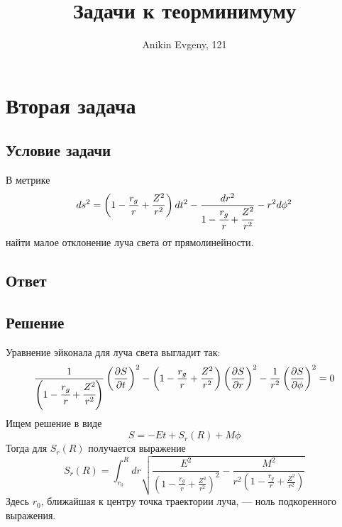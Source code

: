 \documentclass{article}
\title{Задачи к теорминимуму}
\author{Anikin Evgeny, 121}
\begin{document}
\maketitle
\section{Вторая задача}
\subsection{Условие задачи}
В метрике
\begin{equation}
ds^2 = \left(1 - \frac{r_g}{r} + \frac{Z^2}{r^2}\right)dt^2
	- \frac{dr^2}{1 - \cfrac{r_g}{r} + \cfrac{Z^2}{r^2}}
	- r^2 d\phi^2
\end{equation}
найти малое отклонение луча света от прямолинейности.
\subsection{Ответ}

\subsection{Решение}
Уравнение эйконала для луча света выгладит так:
\begin{equation}
\frac{1}{\left(1 - \cfrac{r_g}{r} + \cfrac{Z^2}{r^2}\right)}
			\left(\frac{\partial S}{\partial t}\right)^2 -
\left(1 - \frac{r_g}{r} + \frac{Z^2}{r^2}\right)
			\left(\frac{\partial S}{\partial r}\right)^2
- \frac{1}{r^2} 
			\left(\frac{\partial S}{\partial \phi}\right)^2 = 0
\end{equation}
Ищем решение в виде 
\begin{equation}
	S = -Et + S_r(R) + M\phi
\end{equation}
Тогда для $S_r(R)$ получается выражение
\begin{equation}
S_r(R) = \int_{r_0}^{R} {d} r\sqrt{
		\frac{E^2}{\left( 1 - \frac{r_g}{r} + \frac{Z^2}{r^2} \right)^2} - 
		\frac{M^2}{r^2 \left( 1 - \frac{r_g}{r} + \frac{Z^2}{r^2}\right)}
		}	
\end{equation}
Здесь $r_0$, ближайшая к центру точка траектории луча, --- ноль подкоренного выражения.
\end{document}
